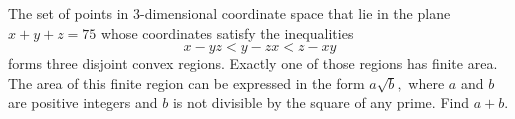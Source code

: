 The set of points in $3$-dimensional coordinate space that lie in the plane $x+y+z=75$ whose coordinates satisfy the inequalities
$$x-yz<y-zx<z-xy$$
forms three disjoint convex regions. Exactly one of those regions has finite area. The area of this finite region can be expressed in the form $a\sqrt{b},$ where $a$ and $b$ are positive integers and $b$ is not divisible by the square of any prime. Find $a+b.$